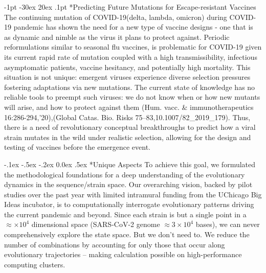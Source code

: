 \documentclass[onecolumn, compsoc,12pt]{IEEEtran}
\makeatletter
\renewcommand\section{\@startsection {section}{1}{\z@}%
                                   {-1pt \@plus -30ex \@minus 20ex}%
                                   {.1pt}%
                                   {\large\bfseries\scshape}}
\renewcommand\paragraph{\@startsection {section}{1}{\z@}%
                                   {-.1ex \@plus -.5ex \@minus -.2ex}%
                                   {0.0ex \@plus.5ex}%
                                   {\fontsize{11}{10}\selectfont\bfseries\itshape\sffamily\color{black}}}
\def\hcov{SARS-CoV-2\xspace}
\def\cov{COVID-19\xspace}
\makeatother
\begin{document}
 

\vspace{20pt}



\clearpage
\setcounter{page}{1}


$\phantom{x}$
\vspace{-35pt}  

\section*{Predicting Future Mutations for  Escape-resistant Vaccines}
The continuing mutation of \cov (delta, lambda, omicron) during \cov pandemic  has shown the need for a new type of vaccine designs - one that is as dynamic and nimble as the virus it plans to protect against. Periodic reformulations similar to  seasonal  flu vaccines,  is  problematic for \cov given its current rapid rate of mutation coupled with a high transmissibility, infectious asymptomatic patients, vaccine hesitancy, and potentially high mortality. This situation is not unique: emergent viruses experience diverse  selection pressures fostering  adaptations via new mutations. The current state of knowledge has no reliable tools to preempt such viruses: we do not know when or how new mutants will arise, and how to protect against them (Hum. vacc. \& immunotherapeutics 16:286-294,'20),(Global Catas. Bio. Risks  75--83,10.1007/82\_2019\_179).%
Thus, there is a need of revolutionary conceptual  breakthroughs to predict how a viral strain  mutates in the wild under realistic selection, allowing for the design and testing of vaccines before the emergence event.

\paragraph*{Unique Aspects} To achieve this goal, we formulated the methodological foundations for a deep understanding of the evolutionary dynamics  in  the sequence/strain space. Our overarching vision, backed by pilot studies over the past year with limited intramural  funding from the UChicago Big Ideas  incubator, is to  computationally interrogate  evolutionary patterns driving  the current  pandemic and beyond. Since each  strain is but a single point in a  $\approx  \times10^4$ dimensional space (\hcov genome  $\approx 3 \times 10^4$ bases), we can never comprehensively explore the  state space. But we don't need to. We reduce the number of combinations by accounting for only those that occur along evolutionary trajectories – making calculation possible on high-performance computing clusters.
\end{document}
